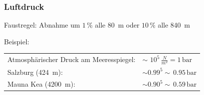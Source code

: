 \documentclass{beamer}
\begin{document}
\begin{frame}
\frametitle{Luftdruck}

Faustregel: Abnahme um \(1\,\%\) alle \SI{80}{\meter} oder \(10\,\%\) alle \SI{840}{\meter} \\[0.5 cm]

\pause


Beispiel: 


\begin{tabular}{ll}
Atmosphärischer Druck am Meeresspiegel: & \(\sim\) \(10^5\,\frac{N}{m^2} = 1\,\text{bar}\) \\[0.2 cm]
Salzburg (\SI{424}{\meter}):            & \(\sim 0.99^5 \sim \, 0.95\, \text{bar}\) \\[0.2 cm]
Mauna Kea (\SI{4200}{\meter}):         & \(\sim 0.90^5 \sim \, 0.59\, \text{bar}\) \\[0.2 cm]
\end{tabular}


\end{frame}
\end{document}
